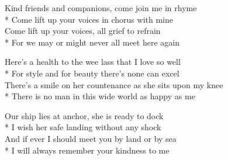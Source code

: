 

\versemark
Kind friends and companions, come join me in rhyme\\*
Come lift up your voices in chorus with mine\\
Come lift up your voices, all grief to refrain\\*
For we may or might never all meet here again


\versemark
Here’s a health to the wee lass that I love so well\\*
For style and for beauty there’s none can excel\\
There’s a smile on her countenance as she sits upon my knee\\*
There is no man in this wide world as happy as me

\versemark
Our ship lies at anchor, she is ready to dock\\*
I wish her safe landing without any shock\\
And if ever I should meet you by land or by sea\\*
I will always remember your kindness to me 

